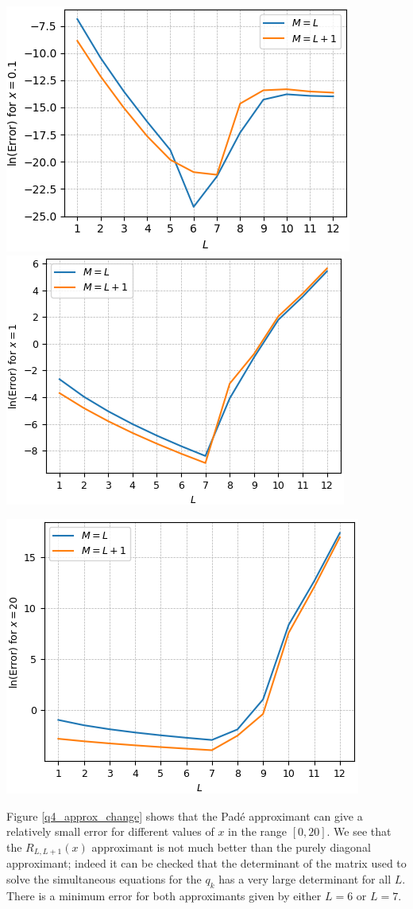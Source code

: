 \documentclass[12pt, a4paper]{article}
\begin{document}
\vspace{0.5cm}

\begin{minipage}{\textwidth}
	\centering
	\includegraphics[width=0.49\linewidth]{q4_approx_x=0.1}
	\includegraphics[width=0.49\linewidth]{q4_approx_x=1}

	\vspace{0.2cm}

	\includegraphics[width=0.5\linewidth]{q4_approx_x=20}

	\vspace*{-0.2cm}

	\label{q4_approx_change}
\end{minipage}

\vspace{0.6cm}

Figure \ref{q4_approx_change} shows that the Pad\'e approximant can give a relatively 
small error for different values of $x$ in the range $[0, 20]$. We see that the 
$R_{L,L+1}(x)$ approximant is not much better than the purely diagonal approximant;
indeed it can be checked that the determinant of the matrix used to solve the
simultaneous equations for the $q_{k}$ has a very large determinant for all $L$.
There is a minimum error for both approximants given by either $L = 6$ or
$L = 7$.
\\
\end{document}
